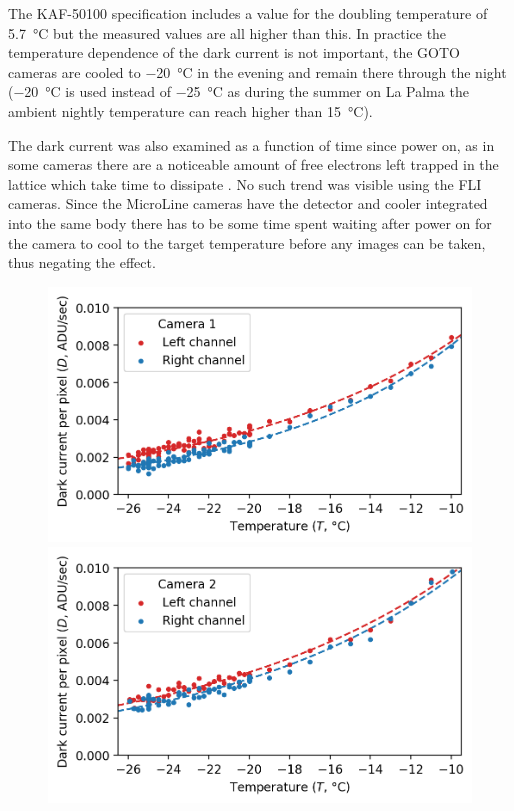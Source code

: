 \begin{colsection}
The KAF-50100 specification includes a value for the doubling temperature of \SI{5.7}{\celsius} but the measured values are all higher than this. In practice the temperature dependence of the dark current is not important, the GOTO cameras are cooled to \SI{-20}{\celsius} in the evening and remain there through the night (\SI{-20}{\celsius} is used instead of \SI{-25}{\celsius} as during the summer on La Palma the ambient nightly temperature can reach higher than \SI{15}{\celsius}).

The dark current was also examined as a function of time since power on, as in some cameras there are a noticeable amount of free electrons left trapped in the lattice which take time to dissipate \citep{Liam}. No such trend was visible using the FLI cameras. Since the MicroLine cameras have the detector and cooler integrated into the same body there has to be some time spent waiting after power on for the camera to cool to the target temperature before any images can be taken, thus negating the effect.

\begin{figure}[p]
    \begin{center}
        \begin{minipage}[t]{0.49\linewidth}\vspace{10pt}
            \includegraphics[width=\linewidth]{images/detectors/dc_1.png}
        \end{minipage}
        \begin{minipage}[t]{0.49\linewidth}\vspace{10pt}
            \includegraphics[width=\linewidth]{images/detectors/dc_2.png}
        \end{minipage}


\end{center}
\end{figure}
\end{colsection}
